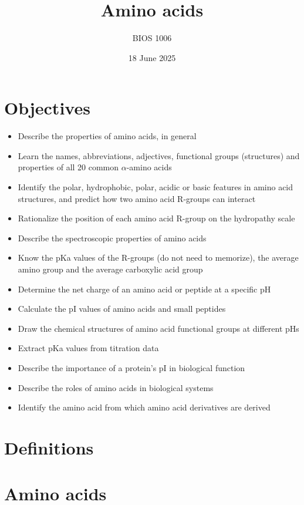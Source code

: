 \documentclass[letterpaper, 12pt]{article}
\title{Amino acids}
\author{BIOS 1006}
\date{18 June 2025}
\begin{document}
\maketitle

\section*{Objectives}

\begin{itemize}
\item Describe the properties of amino acids, in general
\item Learn the names, abbreviations, adjectives, functional groups (structures) and properties of all 20 common $\alpha$-amino acids
\item Identify the polar, hydrophobic, polar, acidic or basic features in amino acid structures, and predict how two amino acid R-groups can interact
\item Rationalize the position of each amino acid R-group on the hydropathy scale
\item Describe the spectroscopic properties of amino acids
\item Know the pKa values of the R-groups (do not need to memorize), the average amino group and the average carboxylic acid group
\item Determine the net charge of an amino acid or peptide at a specific pH
\item Calculate the pI values of amino acids and small peptides
\item Draw the chemical structures of amino acid functional groups at different pHs
\item Extract pKa values from titration data
\item Describe the importance of a protein’s pI in biological function
\item Describe the roles of amino acids in biological systems
\item Identify the amino acid from which amino acid derivatives are derived
\end{itemize}

\newpage

\section*{Definitions}

\newpage

\section*{Amino acids}
\end{document}
